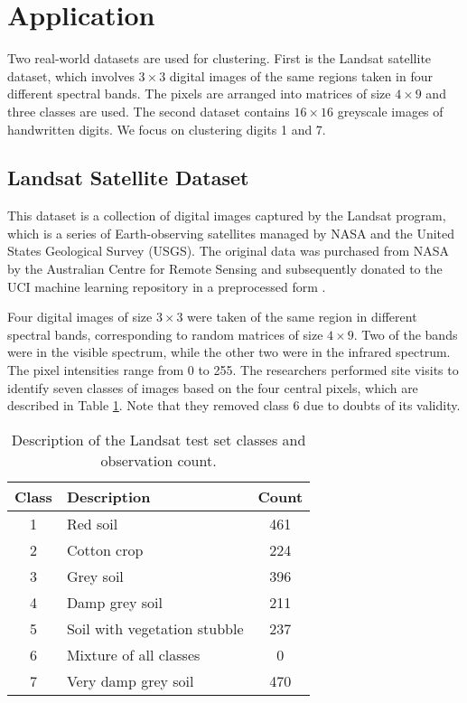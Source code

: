 \documentclass[12pt, centerh1]{article}
\begin{document}



\section{Application}
Two real-world datasets are used for clustering. First is the Landsat satellite dataset, which involves $3 \times 3$ digital images of the same regions taken in four different spectral bands. The pixels are arranged into matrices of size $4 \times 9$ and three classes are used. The second dataset contains $16 \times 16$ greyscale images of handwritten digits. We focus on clustering digits 1 and 7.  





\subsection{Landsat Satellite Dataset}
This dataset is a collection of digital images captured by the Landsat program, which is a series of Earth-observing satellites managed by NASA and the United States Geological Survey (USGS). The original data was purchased from NASA by the Australian Centre for Remote Sensing and subsequently donated to the UCI machine learning repository in a preprocessed form \citep{landsat}. 

Four digital images of size $3 \times 3$ were taken of the same region in different spectral bands, corresponding to random matrices of size $4\times 9$. Two of the bands were in the visible spectrum, while the other two were in the infrared spectrum. The pixel intensities range from 0 to 255. The researchers performed site visits to identify seven classes of images based on the four central pixels, which are described in Table \ref{table:classes}. Note that they removed class 6 due to doubts of its validity.

\begin{table}[!htbp]
  \caption{Description of the Landsat test set classes and observation count.}
    \label{table:classes}
  \begin{tabularx}{\textwidth}{cXc}
    \toprule
    \textbf{Class} & \textbf{Description} & \textbf{Count} \\
    \midrule
    1 & Red soil                        & 461 \\
    2 & Cotton crop                     & 224 \\
    3 & Grey soil                       & 396 \\
    4 & Damp grey soil                  & 211 \\
    5 & Soil with vegetation stubble    & 237 \\
    6 & Mixture of all classes          & 0 \\
    7 & Very damp grey soil             & 470 \\
    \bottomrule
  \end{tabularx}
\end{table}
\end{document}
